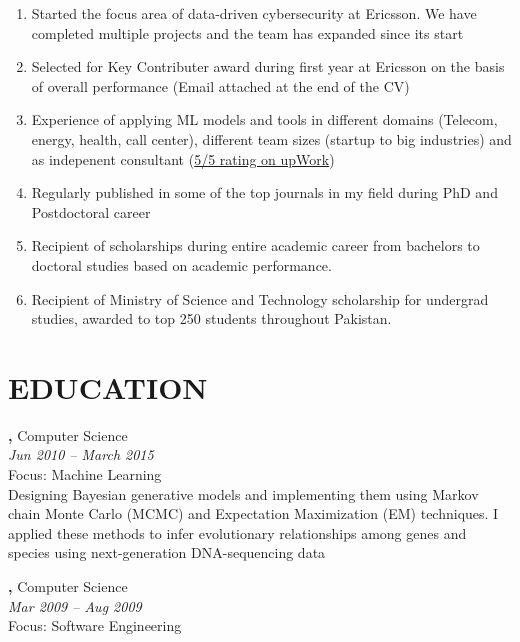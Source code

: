 \documentclass[margin, 10pt]{res} %
\begin{document}
\begin{resume}
\begin{enumerate}
 \item Started the focus area of data-driven cybersecurity at Ericsson. We have completed multiple projects and the team has expanded since its start
 \item Selected for Key Contributer award during first year at Ericsson on the basis of overall performance (Email attached at the end of the CV) 
 \item Experience of applying ML models and tools in different domains (Telecom, energy, health, call center), different team sizes (startup to big industries) and as indepenent consultant (\href{https://www.upwork.com/freelancers/~013a228837c241737c}{5/5 rating on upWork})
 \item Regularly published in some of the top journals in my field during PhD and Postdoctoral career 
 \item Recipient of scholarships during entire academic career from bachelors to doctoral studies based on academic performance. 
 \item Recipient of Ministry of Science and Technology scholarship for undergrad studies, awarded to top 250 students throughout Pakistan.
\end{enumerate} 



\section{EDUCATION}

{\bf \color{Black}{Doctor of Philosophy},} Computer Science \\
{} \hfill \textit{Jun 2010 -- March 2015} \\
Focus: Machine Learning \\
Designing Bayesian generative models and implementing them using Markov chain Monte Carlo (MCMC) and Expectation Maximization (EM) techniques. I applied these methods to infer evolutionary relationships among genes and species using next-generation DNA-sequencing data %

{\bf \color{Black}{Exchange Student},} Computer Science \\
{\color{RubineRed}{University of Limerick, Ireland}} \hfill \textit{Mar 2009 -- Aug 2009} \\
Focus: Software Engineering 


\end{resume}
\end{document}
